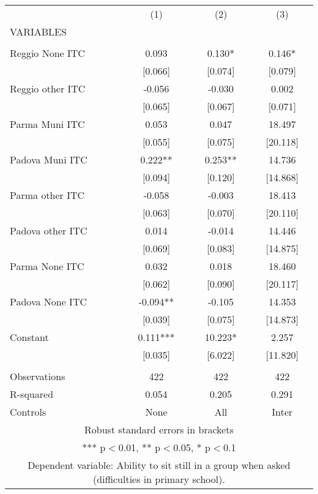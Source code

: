 \begin{tabular}{lccc} \hline
 & (1) & (2) & (3) \\
VARIABLES &  &  &  \\ \hline
 &  &  &  \\
Reggio None ITC & 0.093 & 0.130* & 0.146* \\
 & [0.066] & [0.074] & [0.079] \\
Reggio other ITC & -0.056 & -0.030 & 0.002 \\
 & [0.065] & [0.067] & [0.071] \\
Parma Muni ITC & 0.053 & 0.047 & 18.497 \\
 & [0.055] & [0.075] & [20.118] \\
Padova Muni ITC & 0.222** & 0.253** & 14.736 \\
 & [0.094] & [0.120] & [14.868] \\
Parma other ITC & -0.058 & -0.003 & 18.413 \\
 & [0.063] & [0.070] & [20.110] \\
Padova other ITC & 0.014 & -0.014 & 14.446 \\
 & [0.069] & [0.083] & [14.875] \\
Parma None ITC & 0.032 & 0.018 & 18.460 \\
 & [0.062] & [0.090] & [20.117] \\
Padova None ITC & -0.094** & -0.105 & 14.353 \\
 & [0.039] & [0.075] & [14.873] \\
Constant & 0.111*** & 10.223* & 2.257 \\
 & [0.035] & [6.022] & [11.820] \\
 &  &  &  \\
Observations & 422 & 422 & 422 \\
R-squared & 0.054 & 0.205 & 0.291 \\
 Controls & None & All & Inter \\ \hline
\multicolumn{4}{c}{ Robust standard errors in brackets} \\
\multicolumn{4}{c}{ *** p$<$0.01, ** p$<$0.05, * p$<$0.1} \\
\multicolumn{4}{c}{ Dependent variable: Ability to sit still in a group when asked (difficulties in primary school).} \\
\end{tabular}
